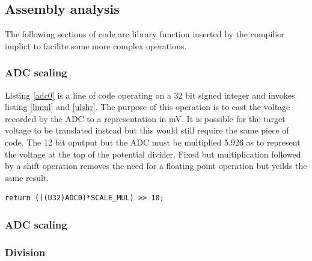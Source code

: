 \documentclass[12pt]{article}%
\begin{document}
\subsection{Assembly analysis}

The following sections of code are library function inserted by the compilier implict to facilite some more complex operations.

\subsubsection{ADC scaling}

Listing \ref{adc0} is a line of code operating on a 32 bit signed integer and invokes listing \ref{limul} and \ref{ulshr}. The purpose of this operation is to cast the voltage recorded by the ADC to a representation in mV. It is possible for the target voltage to be translated instead but this would still require the same piece of code. The 12 bit oputput but the ADC must be multiplied 5.926 as to represent the voltage at the top of the potential divider. Fixed but multiplication followed by a shift operation removes the need for a floating point operation but yeilds the same result.

\lstset{
  caption=LIMUL, 
  basicstyle=\footnotesize, frame=tb,
  xleftmargin=.2\textwidth, xrightmargin=.2\textwidth,
label=adc0
}
\begin{lstlisting}
return (((U32)ADC0)*SCALE_MUL) >> 10;
\end{lstlisting}

\lstset{
  caption=LIMUL, 
  basicstyle=\footnotesize, frame=tb,
  xleftmargin=.2\textwidth, xrightmargin=.2\textwidth,
label=limul
}


\lstset{
  caption=ULSHR, 
  basicstyle=\footnotesize, frame=tb,
  xleftmargin=.2\textwidth, xrightmargin=.2\textwidth,
label=ulshr
}




\subsubsection{ADC scaling}


\lstset{
  caption=IMUL, 
  basicstyle=\footnotesize, frame=tb,
  xleftmargin=.2\textwidth, xrightmargin=.2\textwidth,
label=imul
}





\subsubsection{Division}
\end{document}

